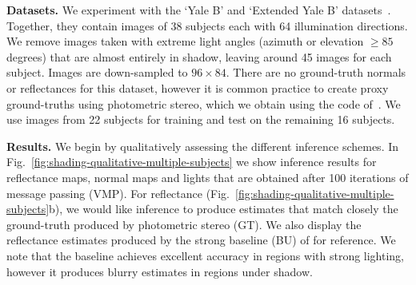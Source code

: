 \begin{figure}[t]
	\centering
	\label{fig:shading-quantitative-reflectance}

	\label{fig:shading-quantitative-light}
\end{figure}

\textbf{Datasets.} We experiment with the `Yale B' and `Extended Yale B' datasets~\citep{Georghiades2001, Lee2005}. Together, they contain images of 38 subjects each with 64 illumination directions. We remove images taken with extreme light angles (azimuth or elevation $\ge 85$ degrees) that are almost entirely in shadow, leaving around 45 images for each subject. Images are down-sampled to $96 \times 84$. There are no ground-truth normals or reflectances for this dataset, however it is common practice to create proxy ground-truths using photometric stereo, which we obtain using the code of~\cite{Queau2013}. We use images from 22 subjects for training and test on the remaining 16 subjects.

\textbf{Results.} We begin by qualitatively assessing the different inference schemes. In Fig.~\ref{fig:shading-qualitative-multiple-subjects} we show inference results for reflectance maps, normal maps and lights that are obtained after 100 iterations of message passing (VMP). For reflectance (Fig.~\ref{fig:shading-qualitative-multiple-subjects}b), we would like inference to produce estimates that match closely the ground-truth produced by photometric stereo (GT). We also display the reflectance estimates produced by the strong baseline (BU) of \cite{Biswas2009} for reference. We note that the baseline achieves excellent accuracy in regions with strong lighting, however it produces blurry estimates in regions under shadow.

